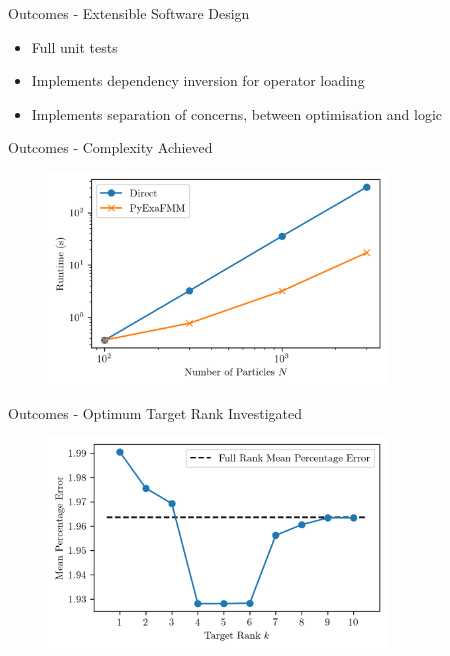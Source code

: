 \begin{frame}{Outcomes - Extensible Software Design}
    \begin{itemize}
        \item Full unit tests
        \item Implements dependency inversion for operator loading
        \item Implements separation of concerns, between optimisation and logic
    \end{itemize}
\end{frame}

\begin{frame}{Outcomes - Complexity Achieved}
    \begin{figure}
        \centering
        \includegraphics[width=0.8\textwidth]{assets/complexity.png}
    \end{figure}
\end{frame}

\begin{frame}{Outcomes - Optimum Target Rank Investigated}
    \begin{figure}
        \centering
        \includegraphics[width=0.8\textwidth]{assets/svd.png}
    \end{figure}
\end{frame}